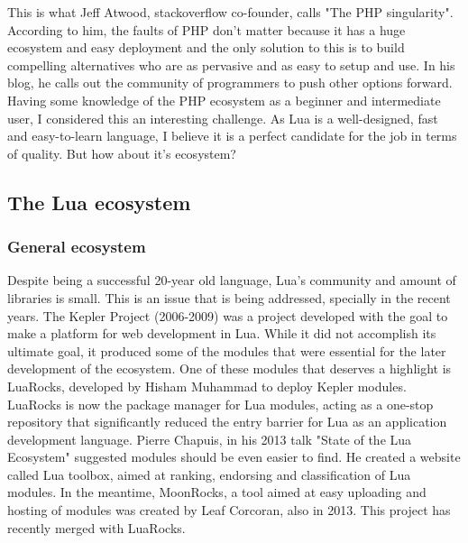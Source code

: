 \documentclass{article}
\begin{document}
This is what Jeff Atwood, stackoverflow co-founder, calls "The PHP singularity"\autocite{phpsing}. According to him, the faults of PHP don't matter because it has a huge ecosystem and easy deployment and the only solution to this is to build compelling alternatives who are as pervasive and as easy to setup and use. In his blog, he calls out the community of programmers to push other options forward.\\

Having some knowledge of the PHP ecosystem as a beginner and intermediate user, I considered this an interesting challenge. As Lua is a well-designed, fast and easy-to-learn language, I believe it is a perfect candidate for the job in terms of quality. But how about it's ecosystem?\\

\subsection{The Lua ecosystem}

\subsubsection{General ecosystem}

Despite being a successful 20-year old language, Lua's community and amount of libraries is small. This is an issue that is being addressed, specially in the recent years. The Kepler Project\autocite{kepler} (2006-2009) was a project developed with the goal to make a platform for web development in Lua\autocite{cgilua}. While it did not accomplish its ultimate goal, it produced some of the modules that were essential for the later development of the ecosystem. One of these modules that deserves a highlight is LuaRocks\autocite{luarocks}, developed by Hisham Muhammad to deploy Kepler modules. LuaRocks is now the package manager for Lua modules, acting as a one-stop repository that significantly reduced the entry barrier for Lua as an application development language. Pierre Chapuis, in his 2013 talk "State of the Lua Ecosystem"\autocite{luaeco} suggested modules should be even easier to find. He created a website called Lua toolbox\autocite{luatoolbox}, aimed at ranking, endorsing and classification of Lua modules. In the meantime, MoonRocks, a tool aimed at easy uploading and hosting of modules\autocite{moonrocks} was created by Leaf Corcoran, also in 2013. This project has recently merged with LuaRocks. \\
\end{document}
